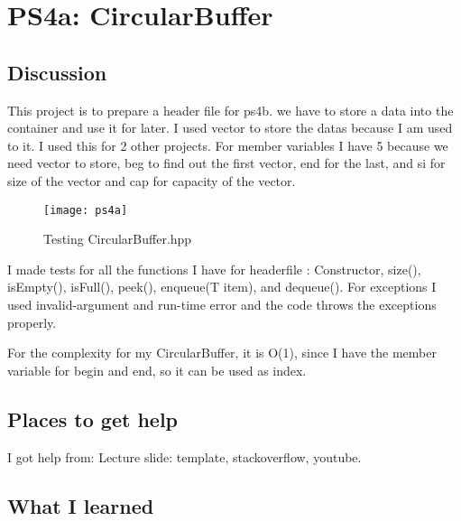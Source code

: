 \section{PS4a: CircularBuffer}\label{sec:ps4a}

\subsection{Discussion}\label{sec:ps4a:disc}

This project is to prepare a header file for ps4b.
we have to store a data into the container and use it for later.
I used vector to store the datas because I am used to it. I used this for 2 other projects.
For member variables I have 5 because we need vector to store, beg to find out the first vector, end for the last, and si for size of the vector and cap for capacity of the vector.

\begin{figure}[tbh]
	\centering
	\texttt{[image: ps4a]}
	\caption{Testing CircularBuffer.hpp}
	\label{fig:ps4a}
\end{figure}

I made tests for all the functions I have for headerfile : Constructor, size(), isEmpty(), isFull(), peek(), enqueue(T item), and dequeue().
For exceptions I used invalid-argument and run-time error and the code throws the exceptions properly.

For the complexity for my CircularBuffer, it is O(1), since I have the member variable for begin and end, so it can be used as index.

\subsection{Places to get help}
I got help from: Lecture slide: template, stackoverflow, youtube.



\subsection{What I learned}\label{sec:ps4a:learned}

